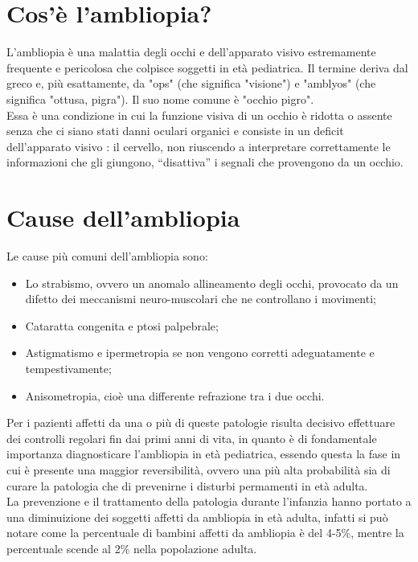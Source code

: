 \documentclass[12pt,a4paper,openright,twoside]{book}
\begin{document}
    \section{Cos'è l'ambliopia?}
    L'ambliopia è una malattia degli occhi e dell'apparato visivo estremamente frequente e pericolosa che colpisce soggetti in età pediatrica.
    Il termine deriva dal greco e, più esattamente, da "ops" (che significa "visione") e "amblyos" (che significa "ottusa, pigra"). Il suo nome comune è "occhio pigro". \cite{wiki:amb} \\ Essa è una condizione in cui la funzione visiva di un occhio è ridotta o assente senza che ci siano stati danni oculari organici e consiste in un deficit dell’apparato visivo : il cervello, non riuscendo a interpretare correttamente le informazioni che gli giungono, “disattiva” i segnali che provengono da un occhio. \cite{iapbamb} \\
    
    \section{Cause dell'ambliopia}
    Le cause più comuni dell'ambliopia sono:
    \begin{itemize}
    	\item Lo strabismo, ovvero un anomalo allineamento degli occhi, provocato da un difetto dei meccanismi neuro-muscolari che ne controllano i movimenti;
    	\item Cataratta congenita e ptosi palpebrale;
    	\item Astigmatismo e ipermetropia se non vengono corretti adeguatamente e tempestivamente;
    	\item Anisometropia, cioè una differente refrazione tra i due occhi. \cite{humamb}
    \end{itemize}
	Per i pazienti affetti da una o più di queste patologie risulta decisivo effettuare dei controlli regolari fin dai primi anni di vita, in quanto è di fondamentale importanza diagnosticare l'ambliopia in età pediatrica, essendo questa la fase in cui è presente una maggior reversibilità, ovvero una più alta probabilità sia di curare la patologia che di prevenirne i disturbi permamenti in età adulta. \cite{wiki:amb}\\
	La prevenzione e il trattamento della patologia durante l'infanzia hanno portato a una diminuizione dei soggetti affetti da ambliopia in età adulta, infatti si può notare come la percentuale di bambini affetti da ambliopia è del 4-5\%, mentre la percentuale scende al 2\% nella popolazione adulta.
\end{document}
